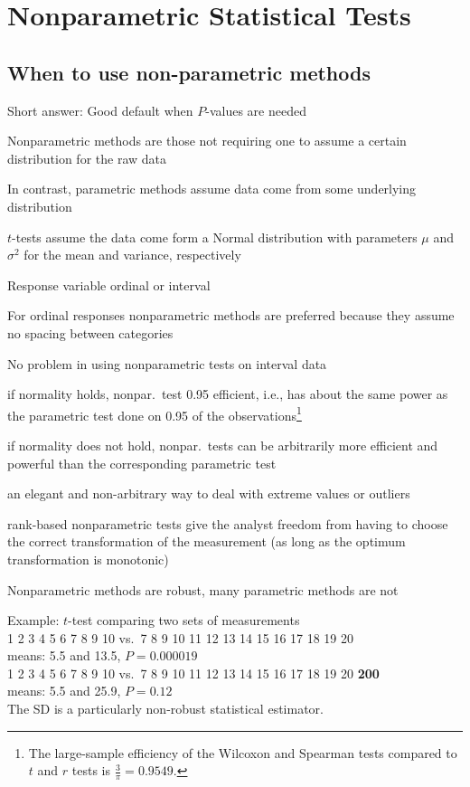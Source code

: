 
%
%

\chapter{Nonparametric Statistical Tests}\label{chap:nonpar}
\section{When to use non-parametric methods}
\bi
\item Short answer: Good default when $P$-values are needed
\item Nonparametric methods are those not requiring one to assume a
  certain distribution for the raw data
  \bi
  \item In contrast, parametric methods assume data come from some underlying distribution
  \item $t$-tests assume the data come form a Normal distribution with parameters $\mu$ and $\sigma^2$ for the mean and variance, respectively
  \ei
\item Response variable ordinal or interval
\item For ordinal responses nonparametric methods are preferred
  because they assume no spacing between categories
\item No problem in using nonparametric tests on interval data
 \bi
 \item if normality holds, nonpar.\ test 0.95 efficient, i.e., has
   about the same power as the parametric test done on 0.95 of the
   observations\footnote{The large-sample efficiency of the Wilcoxon
     and Spearman tests compared to $t$ and $r$ tests is
     $\frac{3}{\pi} = 0.9549$.}
 \item if normality does not hold, nonpar.\ tests can be arbitrarily
   more efficient and powerful than the corresponding parametric test 
 \item an elegant and non-arbitrary way to deal with extreme values or
   outliers
 \item rank-based nonparametric tests give the analyst freedom from
   having to choose the correct transformation of the measurement (as
   long as the optimum transformation is monotonic)
 \ei
\item Nonparametric methods are robust, many parametric methods are
  not
 \bi
 \item Example: $t$-test comparing two sets of measurements\\
   1 2 3 4 5 6 7 8 9 10 \hfill vs.\ \hfill 7 8 9 10 11 12 13 14 15 16
   17 18 19 20\\
   means: 5.5 and 13.5, $P=0.000019$\\
   1 2 3 4 5 6 7 8 9 10 \hfill vs.\ \hfill 7 8 9 10 11 12 13 14 15 16
   17 18 19 20 \textbf{200}\\
   means: 5.5 and 25.9, $P=0.12$\\
   The SD is a particularly non-robust statistical estimator.
  \ei

